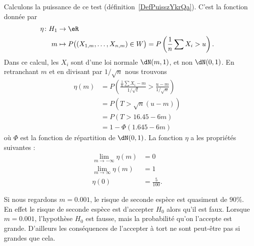 Calculons la puissance de ce test (définition~\ref{DefPuisszYkrQa}). C'est la fonction donnée par
\begin{equation}
	\begin{aligned}
		\eta\colon H_1 & \to \eR                                                                                       \\
		m              & \mapsto P\big( (X_{1,m},\ldots, X_{n,m})\in W \big)=P\left( \frac{1}{ n }\sum X_i>u \right) .
	\end{aligned}
\end{equation}
Dans ce calcul, les \( X_i\) sont d'une loi normale \( \dN(m,1)\), et non \( \dN(0,1)\). En retranchant \( m\) et en divisant par \( 1/\sqrt{n}\) nous trouvons
\begin{subequations}
	\begin{align}
		\eta(m) & =P\left( \frac{ \frac{1}{ n }\sum X_i-m }{ 1/\sqrt{t} }>\frac{ u-m }{ 1/\sqrt{n} } \right) \\
		        & =P(T>\sqrt{n}(u-m))                                                                        \\
		        & =P(T>16.45-6m)                                                                             \\
		        & =1-\Phi(1.645-6m)
	\end{align}
\end{subequations}
où \( \Phi\) est la fonction de répartition de \( \dN(0,1)\). La fonction \( \eta\) a les propriétés suivantes :
\begin{subequations}
	\begin{align}
		\lim_{m\to-\infty}\eta(m) & =0                  \\
		\lim_{m\to\infty}\eta(m)  & =1                  \\
		\eta(0)                   & =\frac{ 5 }{ 100 }.
	\end{align}
\end{subequations}

\begin{remark}
	Si nous regardons \( m=0.001\), le risque de seconde espèce est quasiment de \( 90\%\). En effet le risque de seconde espèce est d'accepter \( H_0\) alors qu'il est faux. Lorsque \( m=0.001\), l'hypothèse \( H_0\) est fausse, mais la probabilité qu'on l'accepte est grande. D'ailleurs les conséquences de l'accepter à tort ne sont peut-être pas si grandes que cela.
\end{remark}

